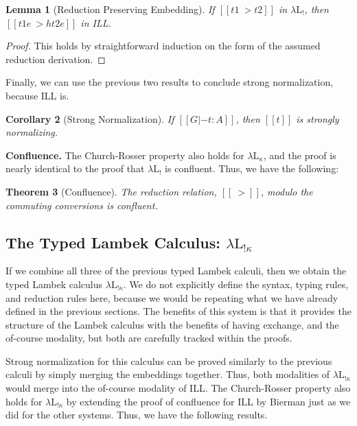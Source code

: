 \documentclass{article}
\newtheorem{theorem}{Theorem}
\newtheorem{lemma}[theorem]{Lemma}
\newtheorem{corollary}[theorem]{Corollary}
\begin{document}
\begin{lemma}[Reduction Preserving Embedding]
  \label{lemma:reduction_preserving_embedding_lambdaLk}
  If $[[t1 ~> t2]]$ in $\lambda\text{L}_!$, then $[[t1 e ~> h{t2 e}]]$
  in ILL.
\end{lemma}
\begin{proof}
  This holds by straightforward induction on the form of the assumed
  reduction derivation.
\end{proof}
\noindent
Finally, we can use the previous two results to conclude strong
normalization, because ILL is.
\begin{corollary}[Strong Normalization]
  \label{corollary:strong_normalization_lambdaLk}
  If $[[G |- t : A]]$, then $[[t]]$ is strongly normalizing.
\end{corollary}

\textbf{Confluence.} The Church-Rosser property also holds for
$\lambda\text{L}_\kappa$, and the proof is nearly identical to the
proof that $\lambda\text{L}_!$ is confluent.  Thus, we have the
following:
\begin{theorem}[Confluence]
  \label{thm:confluence-lambdaLk}
  The reduction relation, $[[~>]]$, modulo the commuting conversions
  is confluent.
\end{theorem}

\subsection{The Typed Lambek Calculus: $\lambda\text{L}_{!\kappa}$}
\label{subsec:the_typed_lambek_calculus:lambda-l-!kappa}
If we combine all three of the previous typed Lambek calculi, then we
obtain the typed Lambek calculus $\lambda\text{L}_{!\kappa}$.  We do
not explicitly define the syntax, typing rules, and reduction rules
here, because we would be repeating what we have already defined in
the previous sections.  The benefits of this system is that it
provides the structure of the Lambek calculus with the benefits of
having exchange, and the of-course modality, but both are carefully
tracked within the proofs.

Strong normalization for this calculus can be proved similarly to the
previous calculi by simply merging the embeddings together.  Thus,
both modalities of $\lambda\text{L}_{!\kappa}$ would merge into the
of-course modality of ILL.  The Church-Rosser property also holds for
$\lambda\text{L}_{!\kappa}$ by extending the proof of confluence for
ILL by Bierman \cite{Bierman:1994} just as we did for the other
systems.  Thus, we have the following results.
\end{document}

